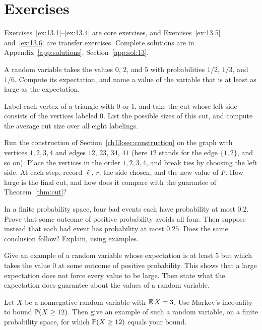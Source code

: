 \section*{Exercises}
Exercises~\ref{ex:13.1}--\ref{ex:13.4} are core exercises, and Exercises~\ref{ex:13.5} and~\ref{ex:13.6} are transfer exercises. Complete solutions are in Appendix~\ref{app:solutions}, Section~\ref{app:sol:13}.
\begin{exercise}\label{ex:13.1}A random variable takes the values $0$, $2$, and $5$ with probabilities $1/2$, $1/3$, and $1/6$. Compute its expectation, and name a value of the variable that is at least as large as the expectation.\end{exercise}
\begin{exercise}\label{ex:13.2}Label each vertex of a triangle with $0$ or $1$, and take the cut whose left side consists of the vertices labeled $0$. List the possible sizes of this cut, and compute the average cut size over all eight labelings.\end{exercise}
\begin{exercise}\label{ex:13.3}Run the construction of Section~\ref{ch13:sec:construction} on the graph with vertices $1,2,3,4$ and edges $12$, $23$, $34$, $41$ (here $12$ stands for the edge $\{1,2\}$, and so on). Place the vertices in the order $1,2,3,4$, and break ties by choosing the left side. At each step, record $\ell$, $r$, the side chosen, and the new value of $F$. How large is the final cut, and how does it compare with the guarantee of Theorem~\ref{thm:cut}?\end{exercise}
\begin{exercise}\label{ex:13.4}In a finite probability space, four bad events each have probability at most $0.2$. Prove that some outcome of positive probability avoids all four. Then suppose instead that each bad event has probability at most $0.25$. Does the same conclusion follow? Explain, using examples.\end{exercise}
\begin{exercise}\label{ex:13.5}Give an example of a random variable whose expectation is at least $5$ but which takes the value $0$ at some outcome of positive probability. This shows that a large expectation does not force every value to be large. Then state what the expectation does guarantee about the values of a random variable.\end{exercise}
\begin{exercise}\label{ex:13.6}Let $X$ be a nonnegative random variable with $\operatorname{\mathbb E} X=3$. Use Markov's inequality to bound $\operatorname{\mathbb P}(X\ge12)$. Then give an example of such a random variable, on a finite probability space, for which $\operatorname{\mathbb P}(X\ge12)$ equals your bound.\end{exercise}
